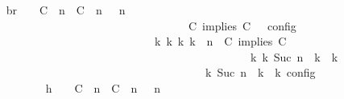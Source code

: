 \begin{isabellebody}
\ \isamarkupfalse%
\ br{}{\isacharcolon}\ {\isacartoucheopen}{\isasymrho}\ {\isasymin}\ {\isasymlbrakk}\ {\isacharparenleft}{\isacharparenleft}C\ {\isasymUp}\ n{\isacharparenright}\ {\isacharhash}\ {\isacharparenleft}C\ {\isasymUp}\ n{\isacharparenright}\ {\isacharhash}\ {\isasymGamma}{\isacharparenright}{\isacharcomma}\ n\isanewline
\ \ \ \ \ \ \ \ \ \ \ \ \ \ \ \ \ \ \ \ \ \ \ \ \ \ \ \ \ \ \ \ {\isasymturnstile}\ {\isasymPsi}\ {\isasymtriangleright}\ {\isacharparenleft}{\isacharparenleft}C\ implies\ C\ {\isacharhash}\ {\isasymPhi}{\isacharparenright}\ {\isasymrbrakk}\isactrlsub c\isactrlsub o\isactrlsub n\isactrlsub f\isactrlsub i\isactrlsub g\isanewline
\ \ \ \ \ \ \ \ \ \ \ \ \ \ \ \ \ \ \ \ \ \ \ \ \ \ \ \ {\isasymLongrightarrow}\ {\isasymexists}{\isasymGamma}\isactrlsub k\ {\isasymPsi}\isactrlsub k\ {\isasymPhi}\isactrlsub k\ k{\isachardot}\ {\isacharparenleft}{\isacharparenleft}{\isasymGamma}{\isacharcomma}\ n\ {\isasymturnstile}\ {\isacharparenleft}{\isacharparenleft}C\ implies\ C\ {\isacharhash}\ {\isasymPsi}{\isacharparenright}\ {\isasymtriangleright}\ {\isasymPhi}{\isacharparenright}\isanewline
\ \ \ \ \ \ \ \ \ \ \ \ \ \ \ \ \ \ \ \ \ \ \ \ \ \ \ \ \ \ \ \ \ \ \ \ \ \ \ \ \ \ \ \ \ \ {\isasymhookrightarrow}\isactrlbsup k\isactrlesup \ {\isacharparenleft}{\isasymGamma}\isactrlsub k{\isacharcomma}\ Suc\ n\ {\isasymturnstile}\ {\isasymPsi}\isactrlsub k\ {\isasymtriangleright}\ {\isasymPhi}\isactrlsub k{\isacharparenright}{\isacharparenright}\isanewline
\ \ \ \ \ \ \ \ \ \ \ \ \ \ \ \ \ \ \ \ \ \ \ \ \ \ \ \ \ \ \ \ \ \ {\isasymand}\ {\isasymrho}\ {\isasymin}\ {\isasymlbrakk}\ {\isasymGamma}\isactrlsub k{\isacharcomma}\ Suc\ n\ {\isasymturnstile}\ {\isasymPsi}\isactrlsub k\ {\isasymtriangleright}\ {\isasymPhi}\isactrlsub k\ {\isasymrbrakk}\isactrlsub c\isactrlsub o\isactrlsub n\isactrlsub f\isactrlsub i\isactrlsub g{\isacartoucheclose}\isanewline
\ \ \ \ \ \ \isamarkupfalse%
\ {\isacharminus}\isanewline
\ \ \ \ \ \ \ \ \isamarkupfalse%
\ h{}{\isacharcolon}\ {\isacartoucheopen}{\isasymrho}\ {\isasymin}\ {\isasymlbrakk}\ {\isacharparenleft}{\isacharparenleft}C\ {\isasymUp}\ n{\isacharparenright}\ {\isacharhash}\ {\isacharparenleft}C\ {\isasymUp}\ n{\isacharparenright}\ {\isacharhash}\ {\isasymGamma}{\isacharparenright}{\isacharcomma}\ n\isanewline

\end{isabellebody}
